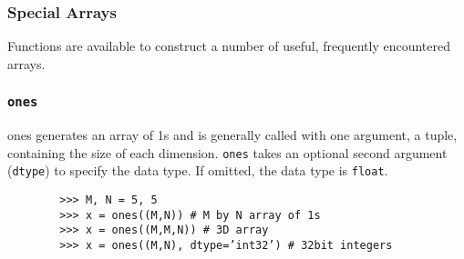 \documentclass[MASTER.tex]{subfiles}
\begin{document}
 

\begin{frame}[fragile]
	\frametitle{Special Arrays}
	Functions are available to construct a number of useful, frequently encountered arrays.
\end{frame}
\begin{frame}[fragile]
	\frametitle{\texttt{ones}}
	ones generates an array of 1s and is generally called with one argument, a tuple, containing the size of
	each dimension. \texttt{ones} takes an optional second argument (\texttt{dtype}) to specify the data type. If omitted, the
	data type is \texttt{float}.
	\begin{framed}
		\begin{verbatim}
		>>> M, N = 5, 5
		>>> x = ones((M,N)) # M by N array of 1s
		>>> x = ones((M,M,N)) # 3D array
		>>> x = ones((M,N), dtype=’int32’) # 32bit integers
		\end{verbatim}
	\end{framed}
\end{frame}
\end{document}
